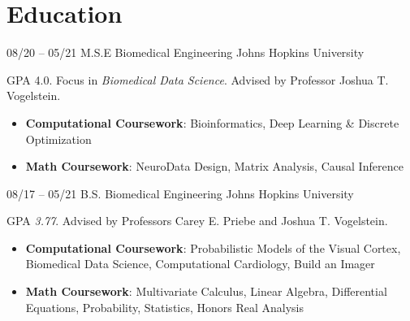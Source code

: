 \section{Education}

\cventry
{08/20 -- 05/21}
{M.S.E Biomedical Engineering}
{%
}
{Johns Hopkins University}
{}
{
GPA 4.0.
Focus in \textit{Biomedical Data Science}.
Advised by Professor Joshua T. Vogelstein.
\begin{itemize}
    \item {\textbf{Computational Coursework}: Bioinformatics, Deep Learning \& Discrete Optimization}
    \item {\textbf{Math Coursework}: NeuroData Design, Matrix Analysis, Causal Inference}
\end{itemize}
}

\cventry
{08/17 -- 05/21}
{B.S. Biomedical Engineering}
{%
}
{Johns Hopkins University}
{}
{
GPA \textit{3.77}.
Advised by Professors Carey E. Priebe and Joshua T. Vogelstein.
\begin{itemize}
    \item {\textbf{Computational Coursework}: Probabilistic Models of the Visual Cortex, Biomedical Data Science, Computational Cardiology, Build an Imager}
    \item {\textbf{Math Coursework}: Multivariate Calculus, Linear Algebra, Differential Equations, Probability, Statistics, Honors Real Analysis}
\end{itemize}
}
